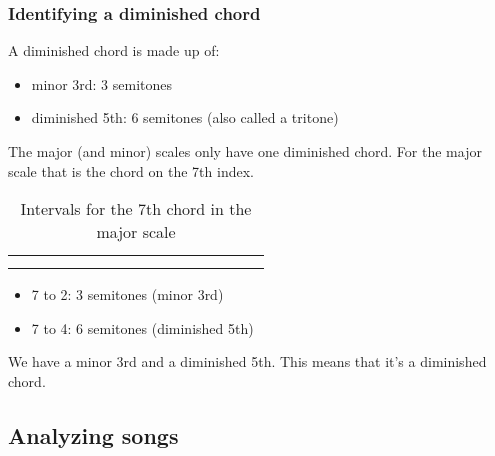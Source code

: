\subsubsection{Identifying a diminished chord} \label{sec:identifying_dimished_chords_in_the_scale}

A diminished chord is made up of:

\begin{itemize}
	\item minor 3rd: 3 semitones
	\item diminished 5th: 6 semitones (also called a tritone)
\end{itemize}


The major (and minor) scales only have one diminished chord. For the major scale that is the chord on the 7th index.

\begin{table}[h]
	\centering
	\begin{NiceTabular}{*{16}{P{0.05mm}}}
		\Block{}{} &  & &  & &  & &  & &  & &  & &  & & \Block{}{} \\
		 & &  & &  & &  & &  & &  & &  & &  &
	\end{NiceTabular}
	\caption{Intervals for the 7th chord in the major scale}
	\label{tab:guitar_major_scale_7th_chord_identify}
\end{table}

\begin{itemize}
	\item 7 to 2: 3 semitones (minor 3rd)
	\item 7 to 4: 6 semitones (diminished 5th)
\end{itemize}

We have a minor 3rd and a diminished 5th. This means that it's a diminished chord.

\newpage

\subsection{Analyzing songs}
